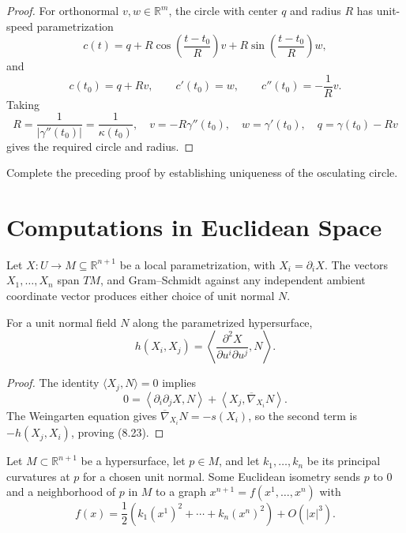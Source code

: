 \begin{proof}
\sketch
For orthonormal $v,w\in\mathbb R^m$, the circle with center $q$ and radius
$R$ has unit-speed parametrization
\[
c(t)=q+R\cos\left(\frac{t-t_0}{R}\right)v
+R\sin\left(\frac{t-t_0}{R}\right)w,
\]
and
\[
c(t_0)=q+Rv,
\qquad c'(t_0)=w,
\qquad c''(t_0)=-\frac1Rv.
\]
Taking
\[
R=\frac1{|\gamma''(t_0)|}=\frac1{\kappa(t_0)},
\quad v=-R\gamma''(t_0),
\quad w=\gamma'(t_0),
\quad q=\gamma(t_0)-Rv
\]
gives the required circle and radius.
\end{proof}

\begin{exercise}
\label{exer:osculating-circle-uniqueness}
Complete the preceding proof by establishing uniqueness of the osculating
circle.
\end{exercise}

\section{Computations in Euclidean Space}

Let $X:U\to M\subseteq\mathbb R^{n+1}$ be a local parametrization, with
$X_i=\partial_iX$.  The vectors $X_1,\ldots,X_n$ span $TM$, and Gram--Schmidt
against any independent ambient coordinate vector produces either choice of
unit normal $N$.

\begin{proposition}
\label{prop:second-fundamental-form-coordinate-formula}
For a unit normal field $N$ along the parametrized hypersurface,
\begin{equation}
h(X_i,X_j)=\left\langle
\frac{\partial^2X}{\partial u^i\partial u^j},N\right\rangle. \tag{8.23}
\end{equation}
\end{proposition}

\begin{proof}
\sketch
The identity $\langle X_j,N\rangle=0$ implies
\[
0=\left\langle\partial_i\partial_jX,N\right\rangle
+\left\langle X_j,\overline\nabla_{X_i}N\right\rangle.
\]
The Weingarten equation gives
$\overline\nabla_{X_i}N=-s(X_i)$, so the second term is
$-h(X_j,X_i)$, proving (8.23).
\end{proof}

\begin{proposition}
\label{prop:principal-curvatures-local-shape}
Let $M\subset\mathbb R^{n+1}$ be a hypersurface, let $p\in M$, and let
$k_1,\ldots,k_n$ be its principal curvatures at $p$ for a chosen unit normal.
Some Euclidean isometry sends $p$ to $0$ and a neighborhood of $p$ in $M$ to
a graph $x^{n+1}=f(x^1,\ldots,x^n)$ with
\begin{equation}
f(x)=\frac12\left(k_1(x^1)^2+\cdots+k_n(x^n)^2\right)+O(|x|^3). \tag{8.24}
\end{equation}
\end{proposition}

